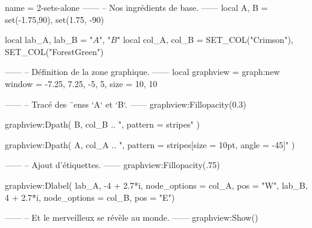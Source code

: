 \documentclass{standalone}
\begin{document}
\begin{luadraw}{name = 2-sets-alone}
------
-- Nos ingrédients de base.
------
local A, B = set(-1.75,90), set(1.75, -90)

local lab_A, lab_B = "$A$", "$B$"
local col_A, col_B = SET_COL("Crimson"), SET_COL("ForestGreen")

------
-- Définition de la zone graphique.
------
local graphview = graph:new{
  window = {-7.25, 7.25, -5, 5},
  size   = {10, 10}
}

------
-- Tracé des ¨enss `A` et `B`.
------
graphview:Fillopacity(0.3)

graphview:Dpath(
  B,
  col_B .. ", pattern = stripes"
)

graphview:Dpath(
  A,
  col_A .. ", pattern = {stripes[size = 10pt, angle = -45]}"
)

------
-- Ajout d'étiquettes.
------
graphview:Fillopacity(.75)

graphview:Dlabel(
  lab_A, -4 + 2.7*i, {node_options = col_A, pos = "W"},
  lab_B,  4 + 2.7*i, {node_options = col_B, pos = "E"})

------
-- Et le merveilleux se révèle au monde.
------
graphview:Show()
\end{luadraw}
\end{document}
